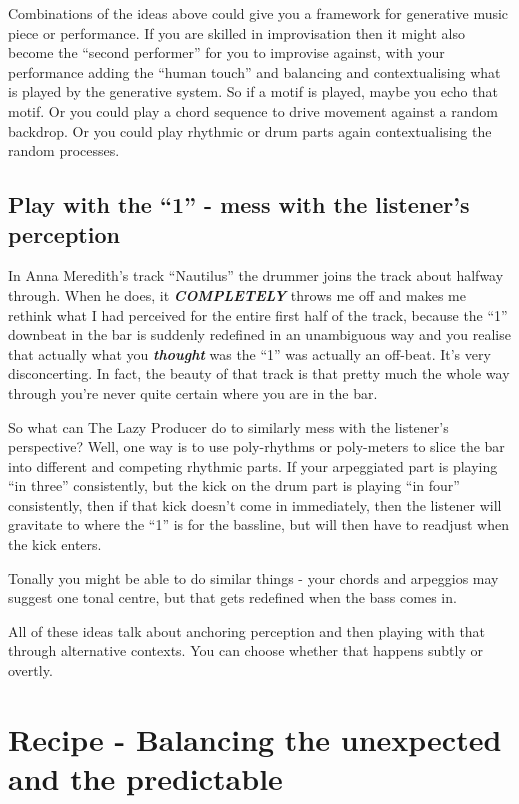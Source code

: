 \documentclass[
  12pt,
  letterpaper,
  oneside,
  open=any]{scrbook}
\begin{document}
Combinations of the ideas above could give you a framework for
generative music piece or performance. If you are skilled in
improvisation then it might also become the ``second performer'' for you
to improvise against, with your performance adding the ``human touch''
and balancing and contextualising what is played by the generative
system. So if a motif is played, maybe you echo that motif. Or you could
play a chord sequence to drive movement against a random backdrop. Or
you could play rhythmic or drum parts again contextualising the random
processes.

\section{Play with the ``1'' - mess with the listener's
perception}\label{play-with-the-1---mess-with-the-listeners-perception}

In Anna Meredith's track ``Nautilus'' the drummer joins the track about
halfway through. When he does, it \textbf{\emph{COMPLETELY}} throws me
off and makes me rethink what I had perceived for the entire first half
of the track, because the ``1'' downbeat in the bar is suddenly
redefined in an unambiguous way and you realise that actually what you
\textbf{\emph{thought}} was the ``1'' was actually an off-beat. It's
very disconcerting. In fact, the beauty of that track is that pretty
much the whole way through you're never quite certain where you are in
the bar.

So what can The Lazy Producer do to similarly mess with the listener's
perspective? Well, one way is to use poly-rhythms or poly-meters to
slice the bar into different and competing rhythmic parts. If your
arpeggiated part is playing ``in three'' consistently, but the kick on
the drum part is playing ``in four'' consistently, then if that kick
doesn't come in immediately, then the listener will gravitate to where
the ``1'' is for the bassline, but will then have to readjust when the
kick enters.

Tonally you might be able to do similar things - your chords and
arpeggios may suggest one tonal centre, but that gets redefined when the
bass comes in.

All of these ideas talk about anchoring perception and then playing with
that through alternative contexts. You can choose whether that happens
subtly or overtly.


\chapter{Recipe - Balancing the unexpected and the
predictable}\label{Chapter-010-Recipe-Balance_random_and_predictable}
\end{document}

